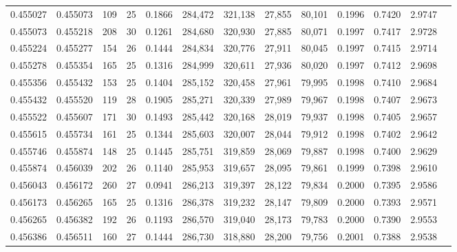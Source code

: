 \begin{tabular}{rrrrrrrrrrrrr}
0.455027 & 0.455073 & 109 &  25 &                                     0.1866 & 284,472 & 321,138 &  27,855 &  80,101 & 0.1996 & 0.7420 & 2.9747 \\
0.455073 & 0.455218 & 208 &  30 &                                     0.1261 & 284,680 & 320,930 &  27,885 &  80,071 & 0.1997 & 0.7417 & 2.9728 \\
0.455224 & 0.455277 & 154 &  26 &                                     0.1444 & 284,834 & 320,776 &  27,911 &  80,045 & 0.1997 & 0.7415 & 2.9714 \\
0.455278 & 0.455354 & 165 &  25 &                                     0.1316 & 284,999 & 320,611 &  27,936 &  80,020 & 0.1997 & 0.7412 & 2.9698 \\
0.455356 & 0.455432 & 153 &  25 &                                     0.1404 & 285,152 & 320,458 &  27,961 &  79,995 & 0.1998 & 0.7410 & 2.9684 \\
0.455432 & 0.455520 & 119 &  28 &                                     0.1905 & 285,271 & 320,339 &  27,989 &  79,967 & 0.1998 & 0.7407 & 2.9673 \\
0.455522 & 0.455607 & 171 &  30 &                                     0.1493 & 285,442 & 320,168 &  28,019 &  79,937 & 0.1998 & 0.7405 & 2.9657 \\
0.455615 & 0.455734 & 161 &  25 &                                     0.1344 & 285,603 & 320,007 &  28,044 &  79,912 & 0.1998 & 0.7402 & 2.9642 \\
0.455746 & 0.455874 & 148 &  25 &                                     0.1445 & 285,751 & 319,859 &  28,069 &  79,887 & 0.1998 & 0.7400 & 2.9629 \\
0.455874 & 0.456039 & 202 &  26 &                                     0.1140 & 285,953 & 319,657 &  28,095 &  79,861 & 0.1999 & 0.7398 & 2.9610 \\
0.456043 & 0.456172 & 260 &  27 &                                     0.0941 & 286,213 & 319,397 &  28,122 &  79,834 & 0.2000 & 0.7395 & 2.9586 \\
0.456173 & 0.456265 & 165 &  25 &                                     0.1316 & 286,378 & 319,232 &  28,147 &  79,809 & 0.2000 & 0.7393 & 2.9571 \\
0.456265 & 0.456382 & 192 &  26 &                                     0.1193 & 286,570 & 319,040 &  28,173 &  79,783 & 0.2000 & 0.7390 & 2.9553 \\
0.456386 & 0.456511 & 160 &  27 &                                     0.1444 & 286,730 & 318,880 &  28,200 &  79,756 & 0.2001 & 0.7388 & 2.9538 \\

\end{tabular}
